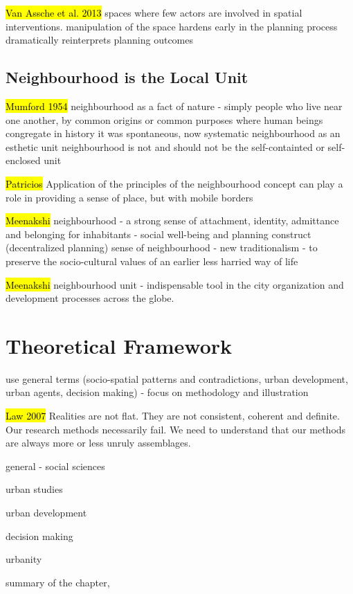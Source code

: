 \documentclass[11pt]{report}
\begin{document}
\hl{Van Assche et al. 2013}
spaces where few actors are involved in spatial interventions.
manipulation of the space hardens early in the planning process dramatically reinterprets planning outcomes

\subsection{Neighbourhood is the Local Unit}

\hl{Mumford 1954}
neighbourhood as a fact of nature - simply people who live near one another, by common origins or common purposes
where human beings congregate
in history it was spontaneous, now systematic
neighbourhood as an esthetic unit
neighbourhood is not and should not be the self-containted or self-enclosed unit

\hl{Patricios}
Application of the principles of the neighbourhood concept can play a role in providing a sense of place, but with mobile borders 

\hl{Meenakshi}
neighbourhood -  a strong sense of attachment, identity, admittance and belonging for inhabitants - social well-being and planning construct (decentralized planning)
sense of neighbourhood - new traditionalism - to preserve the socio-cultural values of an earlier less harried way of life

\hl{Meenakshi}
neighbourhood unit - indispensable tool in the city organization and development processes across the globe.

\section{Theoretical Framework}

use general terms (socio-spatial patterns and contradictions, urban development, urban agents, decision making) - focus on methodology and illustration

\hl{Law 2007}
Realities are not flat. They are not consistent, coherent and definite. Our research methods necessarily fail. We need to understand that our methods are always more or less unruly assemblages.

general - social sciences

urban studies

urban development

decision making

urbanity

summary of the chapter,
\end{document}
